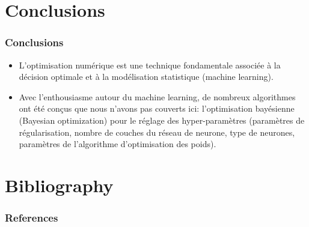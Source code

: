 \documentclass[12pt]{beamer}
\begin{document}
\section{Conclusions}

\begin{frame}
\frametitle{Conclusions}
\begin{itemize}
\item L'optimisation numérique est une technique fondamentale associée à la décision optimale et à la modélisation statistique (machine learning).
\item Avec l'enthousiasme autour du machine learning, de nombreux algorithmes ont été conçus que nous n'avons pas couverts ici: l'optimisation bayésienne (Bayesian optimization) pour le réglage des hyper-paramètres (paramètres de régularisation, nombre de couches du réseau de neurone, type de neurones, paramètres de l'algorithme d'optimisation des poids).
\end{itemize}
\end{frame}

\section{Bibliography}

\begin{frame}[allowframebreaks]
\frametitle{References}
\scriptsize
%   
   
   
\end{frame}
\end{document}
